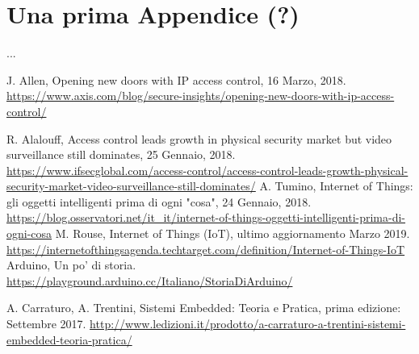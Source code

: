 \documentclass[12pt]{report}
\begin{document}
\appendix
\chapter{Una prima Appendice (?)}
...

%
%
\begin{thebibliography}{00}
	

J. Allen, Opening new doors with IP access control, 16 Marzo, 2018. \url{https://www.axis.com/blog/secure-insights/opening-new-doors-with-ip-access-control/}
%

R. Alalouff, Access control leads growth in physical security market but video surveillance still dominates, 25 Gennaio, 2018.
\url{https://www.ifsecglobal.com/access-control/access-control-leads-growth-physical-security-market-video-surveillance-still-dominates/}
%
A. Tumino, Internet of Things: gli oggetti intelligenti prima di ogni "cosa", 24 Gennaio, 2018.
\url{https://blog.osservatori.net/it_it/internet-of-things-oggetti-intelligenti-prima-di-ogni-cosa}
%
M. Rouse, Internet of Things (IoT), ultimo aggiornamento Marzo 2019.
\url{https://internetofthingsagenda.techtarget.com/definition/Internet-of-Things-IoT}
% 
Arduino, Un po' di storia.
\url{https://playground.arduino.cc/Italiano/StoriaDiArduino/}
%

A. Carraturo, A. Trentini, Sistemi Embedded: Teoria e Pratica, prima edizione: Settembre 2017.
\url{http://www.ledizioni.it/prodotto/a-carraturo-a-trentini-sistemi-embedded-teoria-pratica/}
%

\end{thebibliography}
%
\end{document}
